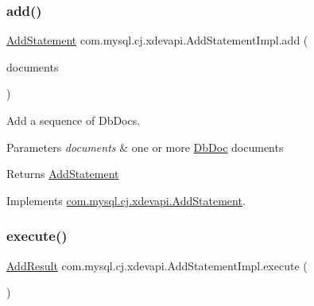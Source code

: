 \subsubsection{\texorpdfstring{add()}{add()}\hspace{0.1cm}{\footnotesize\ttfamily [2/2]}}
{\footnotesize\ttfamily \mbox{\hyperlink{interfacecom_1_1mysql_1_1cj_1_1xdevapi_1_1_add_statement}{Add\+Statement}} com.\+mysql.\+cj.\+xdevapi.\+Add\+Statement\+Impl.\+add (\begin{DoxyParamCaption}\item[{Db\+Doc...}]{documents }\end{DoxyParamCaption})}

Add a sequence of Db\+Docs.


\begin{DoxyParams}{Parameters}
{\em documents} & one or more \mbox{\hyperlink{interfacecom_1_1mysql_1_1cj_1_1xdevapi_1_1_db_doc}{Db\+Doc}} documents \\
\hline
\end{DoxyParams}
\begin{DoxyReturn}{Returns}
\mbox{\hyperlink{interfacecom_1_1mysql_1_1cj_1_1xdevapi_1_1_add_statement}{Add\+Statement}} 
\end{DoxyReturn}


Implements \mbox{\hyperlink{interfacecom_1_1mysql_1_1cj_1_1xdevapi_1_1_add_statement_a886e1294099cf00085c882aba48bf06e}{com.\+mysql.\+cj.\+xdevapi.\+Add\+Statement}}.

\mbox{\label{classcom_1_1mysql_1_1cj_1_1xdevapi_1_1_add_statement_impl_a4448de4bfd47a9a6316509ff4ca0b9d1}} 
\subsubsection{\texorpdfstring{execute()}{execute()}}
{\footnotesize\ttfamily \mbox{\hyperlink{interfacecom_1_1mysql_1_1cj_1_1xdevapi_1_1_add_result}{Add\+Result}} com.\+mysql.\+cj.\+xdevapi.\+Add\+Statement\+Impl.\+execute (\begin{DoxyParamCaption}{ }\end{DoxyParamCaption})}

\mbox{\label{classcom_1_1mysql_1_1cj_1_1xdevapi_1_1_add_statement_impl_abd553acbd2c91815014b2708a26ccb8f}} 
